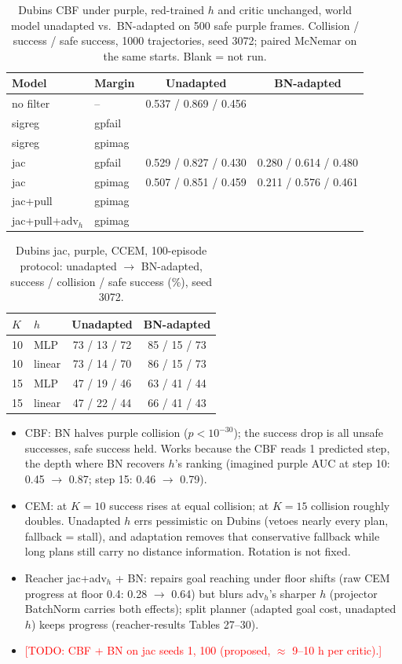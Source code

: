 \documentclass{article}
\newcommand{\todo}[1]{\textcolor{red}{[TODO: #1]}}
\begin{document}
\begin{table}[t]\centering\small
\caption{Dubins CBF under purple, red-trained $h$ and critic unchanged, world model unadapted vs.\ BN-adapted on 500 safe purple frames. Collision / success / safe success, 1000 trajectories, seed 3072; paired McNemar on the same starts. Blank = not run.}
\label{tab:cbf_bn}
\begin{tabular}{llcc}
\toprule
Model & Margin & Unadapted & BN-adapted \\
\midrule
no filter & -- & 0.537 / 0.869 / 0.456 & \\
sigreg & gpfail &  &  \\
sigreg & gpimag &  &  \\
jac & gpfail & 0.529 / 0.827 / 0.430 & 0.280 / 0.614 / 0.480 \\
jac & gpimag & 0.507 / 0.851 / 0.459 & 0.211 / 0.576 / 0.461 \\
jac+pull & gpimag &  &  \\
jac+pull+adv$_h$ & gpimag &  &  \\
\bottomrule
\end{tabular}
\end{table}

\begin{table}[t]\centering\small
\caption{Dubins jac, purple, CCEM, 100-episode protocol: unadapted $\to$ BN-adapted, success / collision / safe success (\%), seed 3072.}
\label{tab:dubins_jac_bn}
\begin{tabular}{llcc}
\toprule
$K$ & $h$ & Unadapted & BN-adapted \\
\midrule
10 & MLP & 73 / 13 / 72 & 85 / 15 / 73 \\
10 & linear & 73 / 14 / 70 & 86 / 15 / 73 \\
15 & MLP & 47 / 19 / 46 & 63 / 41 / 44 \\
15 & linear & 47 / 22 / 44 & 66 / 41 / 43 \\
\bottomrule
\end{tabular}
\end{table}

\begin{itemize}
  \item CBF: BN halves purple collision ($p<10^{-30}$); the success drop is all unsafe successes, safe success held. Works because the CBF reads 1 predicted step, the depth where BN recovers $h$'s ranking (imagined purple AUC at step 10: 0.45 $\to$ 0.87; step 15: 0.46 $\to$ 0.79).
  \item CEM: at $K=10$ success rises at equal collision; at $K=15$ collision roughly doubles. Unadapted $h$ errs pessimistic on Dubins (vetoes nearly every plan, fallback = stall), and adaptation removes that conservative fallback while long plans still carry no distance information. Rotation is not fixed.
  \item Reacher jac+adv$_h$ + BN: repairs goal reaching under floor shifts (raw CEM progress at floor 0.4: 0.28 $\to$ 0.64) but blurs adv$_h$'s sharper $h$ (projector BatchNorm carries both effects); split planner (adapted goal cost, unadapted $h$) keeps progress (reacher-results Tables 27--30).
  \item \todo{CBF + BN on jac seeds 1, 100 (proposed, $\approx$ 9--10 h per critic).}
\end{itemize}
\end{document}
